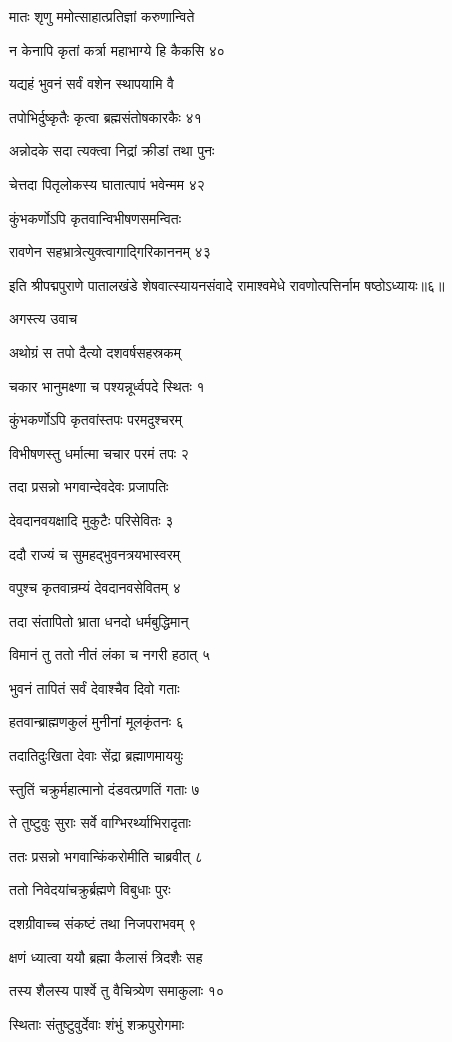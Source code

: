 मातः शृणु ममोत्साहात्प्रतिज्ञां करुणान्विते

न केनापि कृतां कर्त्रा महाभाग्ये हि कैकसि ४०

यद्यहं भुवनं सर्वं वशेन स्थापयामि वै

तपोभिर्दुष्कृतैः कृत्वा ब्रह्मसंतोषकारकैः ४१

अन्नोदके सदा त्यक्त्वा निद्रां क्रीडां तथा पुनः

चेत्तदा पितृलोकस्य घातात्पापं भवेन्मम ४२

कुंभकर्णोऽपि कृतवान्विभीषणसमन्वितः

रावणेन सहभ्रात्रेत्युक्त्वागाद्गिरिकाननम् ४३

इति श्रीपद्मपुराणे पातालखंडे शेषवात्स्यायनसंवादे रामाश्वमेधे रावणोत्पत्तिर्नाम षष्ठोऽध्यायः॥६॥


अगस्त्य उवाच

अथोग्रं स तपो दैत्यो दशवर्षसहस्रकम्

चकार भानुमक्ष्णा च पश्यन्नूर्ध्वपदे स्थितः १

कुंभकर्णोऽपि कृतवांस्तपः परमदुश्चरम्

विभीषणस्तु धर्मात्मा चचार परमं तपः २

तदा प्रसन्नो भगवान्देवदेवः प्रजापतिः

देवदानवयक्षादि मुकुटैः परिसेवितः ३

ददौ राज्यं च सुमहद्भुवनत्रयभास्वरम्

वपुश्च कृतवान्रम्यं देवदानवसेवितम् ४

तदा संतापितो भ्राता धनदो धर्मबुद्धिमान्

विमानं तु ततो नीतं लंका च नगरी हठात् ५

भुवनं तापितं सर्वं देवाश्चैव दिवो गताः

हतवान्ब्राह्मणकुलं मुनीनां मूलकृंतनः ६

तदातिदुःखिता देवाः सेंद्रा ब्रह्माणमाययुः

स्तुतिं चक्रुर्महात्मानो दंडवत्प्रणतिं गताः ७

ते तुष्टुवुः सुराः सर्वे वाग्भिरर्थ्याभिरादृताः

ततः प्रसन्नो भगवान्किंकरोमीति चाब्रवीत् ८

ततो निवेदयांचक्रुर्ब्रह्मणे विबुधाः पुरः

दशग्रीवाच्च संकष्टं तथा निजपराभवम् ९

क्षणं ध्यात्वा ययौ ब्रह्मा कैलासं त्रिदशैः सह

तस्य शैलस्य पार्श्वे तु वैचित्र्येण समाकुलाः १०

स्थिताः संतुष्टुवुर्देवाः शंभुं शक्रपुरोगमाः

